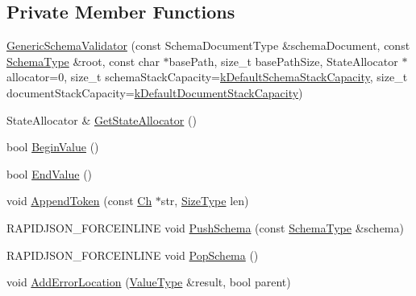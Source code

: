 \subsection*{Private Member Functions}
\begin{DoxyCompactItemize}
\item 
\mbox{\hyperlink{classrapidjson_1_1_generic_schema_validator_a535c8ab7a6c55b989f7e54c9708491ba}{Generic\+Schema\+Validator}} (const Schema\+Document\+Type \&schema\+Document, const \mbox{\hyperlink{classrapidjson_1_1_generic_schema_validator_a0619c9faf3014ef141d1c6d05ae04ddc}{Schema\+Type}} \&root, const char $\ast$base\+Path, size\+\_\+t base\+Path\+Size, State\+Allocator $\ast$allocator=0, size\+\_\+t schema\+Stack\+Capacity=\mbox{\hyperlink{classrapidjson_1_1_generic_schema_validator_ad11f6f1456ca3196a6ea4af85f0e7dca}{k\+Default\+Schema\+Stack\+Capacity}}, size\+\_\+t document\+Stack\+Capacity=\mbox{\hyperlink{classrapidjson_1_1_generic_schema_validator_aa80da69ff44fff7e6e62d2444359d4e6}{k\+Default\+Document\+Stack\+Capacity}})
\item 
State\+Allocator \& \mbox{\hyperlink{classrapidjson_1_1_generic_schema_validator_a0ab1c8404f93bf99595dcc6c8d5bce1e}{Get\+State\+Allocator}} ()
\item 
bool \mbox{\hyperlink{classrapidjson_1_1_generic_schema_validator_ab073b6c4c87b0db7de49f084c11229ba}{Begin\+Value}} ()
\item 
bool \mbox{\hyperlink{classrapidjson_1_1_generic_schema_validator_abd27044b18e400e5a25e6346b7535fbb}{End\+Value}} ()
\item 
void \mbox{\hyperlink{classrapidjson_1_1_generic_schema_validator_a1aef01032c3bb41476d3e2f044332a46}{Append\+Token}} (const \mbox{\hyperlink{classrapidjson_1_1_generic_schema_validator_ab5b7093443e29cf66eb7cf47f3d8583d}{Ch}} $\ast$str, \mbox{\hyperlink{namespacerapidjson_a44eb33eaa523e36d466b1ced64b85c84}{Size\+Type}} len)
\item 
R\+A\+P\+I\+D\+J\+S\+O\+N\+\_\+\+F\+O\+R\+C\+E\+I\+N\+L\+I\+NE void \mbox{\hyperlink{classrapidjson_1_1_generic_schema_validator_a043f74a46ce0a62f4732e7224d5f57d0}{Push\+Schema}} (const \mbox{\hyperlink{classrapidjson_1_1_generic_schema_validator_a0619c9faf3014ef141d1c6d05ae04ddc}{Schema\+Type}} \&schema)
\item 
R\+A\+P\+I\+D\+J\+S\+O\+N\+\_\+\+F\+O\+R\+C\+E\+I\+N\+L\+I\+NE void \mbox{\hyperlink{classrapidjson_1_1_generic_schema_validator_ae7f2ce25d8da4f696441f3bd92a97aa2}{Pop\+Schema}} ()
\item 
void \mbox{\hyperlink{classrapidjson_1_1_generic_schema_validator_a0094311f0ad58f1884855db80a1f2296}{Add\+Error\+Location}} (\mbox{\hyperlink{classrapidjson_1_1_generic_schema_validator_a14216aea798d69f102987c1aae36e897}{Value\+Type}} \&result, bool parent)

\end{DoxyCompactItemize}
